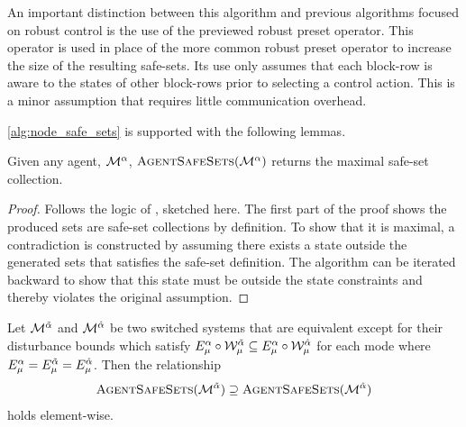 \begin{remark}
An important distinction between this algorithm and previous algorithms focused on robust control is the use of the previewed robust preset operator. This operator is used in place of the more common robust preset operator to increase the size of the resulting safe-sets. Its use only assumes that each block-row is aware to the states of other block-rows prior to selecting a control action. This is a minor assumption that requires little communication overhead.
\end{remark}
\autoref{alg:node_safe_sets} is supported with the following lemmas. 
\begin{lemma}\label{lemma:maximal_proof}
Given any agent, $\mathcal{M}^{\alpha}$, $\Call{AgentSafeSets}{\agent{\agentidx}}$ returns the maximal safe-set collection.
\end{lemma}
\begin{proof}
Follows the logic of \cite[Theorem 2]{Danielson2019}, sketched here. The first part of the proof shows the produced sets are safe-set collections by definition. To show that it is maximal, a contradiction is constructed by assuming there exists a state outside the generated sets that satisfies the safe-set definition. The algorithm can be iterated backward to show that this state must be outside the state constraints and thereby violates the original assumption.
\end{proof}
\begin{lemma}
Let $\mathcal{M}^{\tilde{\alpha}}$ and $\mathcal{M}^{\hat{\alpha}}$ be two switched systems that are equivalent except for their disturbance bounds which satisfy $E_{{\mu}}^{\alpha}\circ\mathcal{W}^{\tilde{\alpha}}_{\mu}\subseteq E_{{\mu}}^{\alpha}\circ\mathcal{W}^{\hat{\alpha}}_{\mu}$ for each mode where $E_{{\mu}}^{\alpha}=E_{{\mu}}^{\tilde{\alpha}}=E_{{\mu}}^{\hat{\alpha}}$. Then the relationship
$$\Call{AgentSafeSets}{\agent{\tilde\agentidx}}\supseteq\Call{AgentSafeSets}{\agent{\hat\agentidx}}$$
 holds element-wise. 
\end{lemma}
